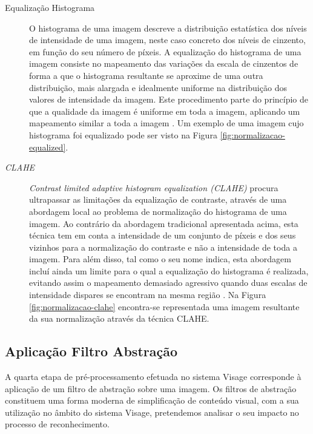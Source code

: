 \begin{description}
\item[Equalização Histograma]
O histograma de uma imagem descreve a distribuição estatística dos níveis de intensidade de uma imagem, neste caso concreto dos níveis de cinzento, em função do seu número de píxeis. A equalização do histograma de uma imagem consiste no mapeamento das variações da escala de cinzentos de forma a que o histograma resultante se aproxime de uma outra distribuição, mais alargada e idealmente uniforme na distribuição dos valores de intensidade da imagem. Este procedimento parte do princípio de que a qualidade da imagem é uniforme em toda a imagem, aplicando um mapeamento similar a toda a imagem \cite{Bradski2008}. Um exemplo de uma imagem cujo histograma foi equalizado pode ser visto na Figura \ref{fig:normalizacao-equalized}.
\end{description}

\begin{description}
\item[\textit{CLAHE}]
\textit{Contrast limited adaptive histogram equalization (CLAHE)} procura ultrapassar as limitações da equalização de contraste, através de uma abordagem local ao problema de normalização do histograma de uma imagem. Ao contrário da abordagem tradicional apresentada acima, esta técnica tem em conta a intensidade de um conjunto de píxeis e dos seus vizinhos para a normalização do contraste e não a intensidade de toda a imagem. Para além disso, tal como o seu nome indica, esta abordagem incluí ainda um limite para o qual a equalização do histograma é realizada, evitando assim o mapeamento demasiado agressivo quando duas escalas de intensidade dispares se encontram na mesma região \cite{Reza2004}. Na Figura \ref{fig:normalizacao-clahe} encontra-se representada uma imagem resultante da sua normalização através da técnica CLAHE.
\end{description}

\subsection{Aplicação Filtro Abstração} \label{sec:filtros}
A quarta etapa de pré-processamento efetuada no sistema Visage corresponde à aplicação de um filtro de abstração sobre uma imagem. Os filtros de abstração constituem uma forma moderna de simplificação de conteúdo visual, com a sua utilização no âmbito do sistema Visage, pretendemos analisar o seu impacto no processo de reconhecimento.

